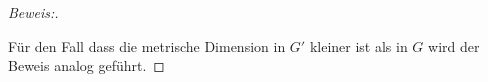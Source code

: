 \begin{proof}[Beweis:]
\begin{enumerate}
\end{enumerate}
Für den Fall dass die metrische Dimension in $G'$ kleiner ist als in $G$ wird der Beweis analog geführt.
\end{proof}
